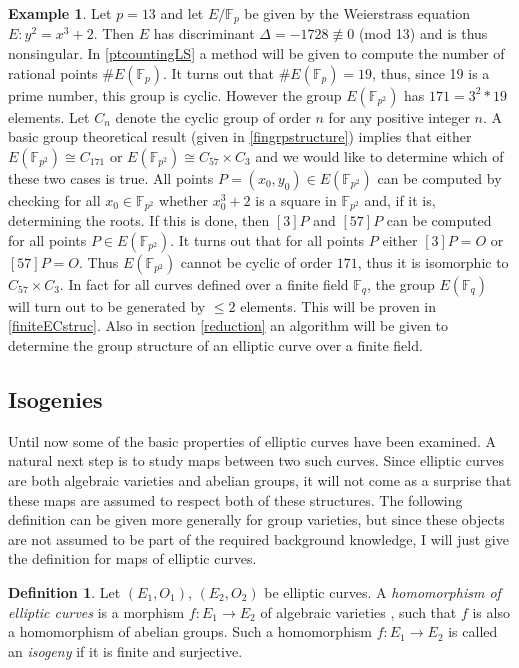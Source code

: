 \documentclass{article}
\numberwithin{equation}{section}
\theoremstyle{definition}
\newtheorem{definition}[theorem]{Definition}
\newtheorem{example}[theorem]{Example}
\newcommand{\FF}[1]{{\mathbb F}_{#1}} %
\begin{document}
\begin{example}\label{fingrpex}
Let $p=13$ and let $E/\FF{p}$ be given by the Weierstrass equation $E:y^2=x^3+2$. Then $E$ has discriminant $\Delta=-1728 \not \equiv 0$ (mod 13) and is thus nonsingular. In \ref{ptcountingLS} a method will be given to compute the number of rational points $\#E(\FF{p})$. It turns out that $\#E(\FF{p})=19$, thus, since 19 is a prime number, this group is cyclic. However the group $E(\FF{p^2})$ has $171=3^2*19$ elements. Let $C_n$ denote the cyclic group of order $n$ for any positive integer $n$. A basic group theoretical result  (given in \ref{fingrpstructure}) implies that either $E(\FF{p^2}) \cong C_{171}$ or $E(\FF{p^2}) \cong   C_{57} \times C_3$ and we would like to determine which of these two cases is true. All points $P=(x_0,y_0) \in E(\FF{p^2})$ can be computed by checking for all $x_0 \in \FF{p^2}$ whether $x_0^3+2$ is a square in $\FF{p^2}$ and, if it is, determining the roots. If this is done, then $[3]P$ and $[57]P$ can be computed for all points $P\in E(\FF{p^2})$. It turns out that for all points $P$ either $[3]P = O$ or $[57]P=O$. Thus $E(\FF{p^2})$ cannot be cyclic of order $171$, thus it is isomorphic to $C_{57} \times C_3$. In fact for all curves defined over a finite field $\FF{q}$, the group $E(\FF{q})$ will turn out to be generated by $\leq 2$ elements. This will be proven in \ref{finiteECstruc}. Also in section \ref{reduction} an algorithm will be given to determine the group structure of an elliptic curve over a finite field.
\end{example}




\subsection{Isogenies}\label{isogenies}
Until now some of the basic properties of elliptic curves have been examined. A natural next step is to study maps between two such curves. Since elliptic curves are both algebraic varieties and abelian groups, it will not come as a surprise that these maps are assumed to respect both of these structures. The following definition can be given more generally for group varieties, but since these objects are not assumed to be part of the required background knowledge, I will just give the definition for maps of elliptic curves.

\begin{definition}
Let $(E_1,O_1)$, $(E_2,O_2)$ be elliptic curves. A \emph{homomorphism of elliptic curves}  is a morphism $f:E_1 \rightarrow E_2$ of algebraic varieties , such that $f$ is also a homomorphism of abelian groups. Such a homomorphism $f:E_1 \rightarrow E_2$ is called an \emph{isogeny} if it is finite and surjective.
\end{definition}
\end{document}
